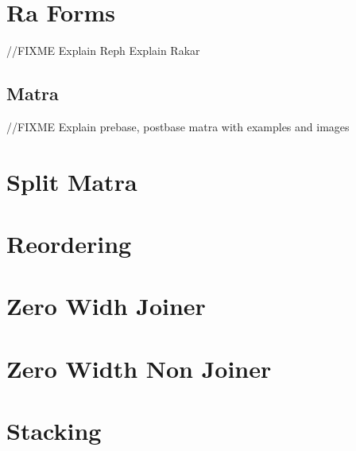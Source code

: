 \section{Ra Forms }
//FIXME
Explain Reph
Explain Rakar

\subsection*{Matra}
//FIXME
Explain prebase, postbase matra with examples and images

\section{Split Matra }

\section{Reordering }

\section{Zero Widh Joiner }

\section{Zero Width Non Joiner }

\section{Stacking }

